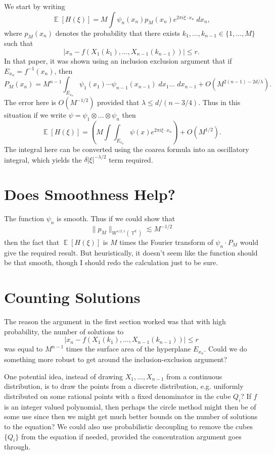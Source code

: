 \documentclass[dvipsnames,letterpaper,12pt]{article}
\numberwithin{equation}{section}
\DeclareMathOperator{\TT}{\mathbb{T}}
\numberwithin{theorem}{section}
\DeclareMathOperator{\EE}{\mathbb{E}}
\begin{document}
We start by writing
%
\[ \EE[H(\xi)] = M \int \psi_n(x_n) p_M(x_n) e^{2 \pi i \xi \cdot x_n}\; dx_n, \]
%
where $p_M(x_n)$ denotes the probability that there exists $k_1,\dots,k_{n-1} \in \{ 1, \dots, M \}$ such that
%
\[ |x_n - f(X_1(k_1),\dots, X_{n-1}(k_{n-1}))| \leq r. \]
%
In that paper, it was shown using an inclusion exclusion argument that if $E_{x_n} = f^{-1}(x_n)$, then
%
\[ P_M(x_n) = M^{n-1} \int_{E_{x_n}} \psi_1(x_1) \cdots \psi_{n-1}(x_{n-1})\; dx_1 \dots\; dx_{n-1} + O(M^{2(n-1) - 2d/\lambda}). \]
%
The error here is $O(M^{-1/2})$ provided that $\lambda \leq d / (n - 3/4)$. Thus in this situation if we write $\psi = \psi_1 \otimes \dots \otimes \psi_n$ then
%
\[ \EE[H(\xi)] = \left( M \int \int_{E_{x_n}} \psi(x) e^{2 \pi i \xi \cdot x_n} \right) + O(M^{1/2}). \]
%
The integral here can be converted using the coarea formula into an oscillatory integral, which yields the $\delta |\xi|^{-\lambda/2}$ term required.

\section{Does Smoothness Help?}

The function $\psi_n$ is smooth. Thus if we could show that
%
\[ \| p_M \|_{W^{s/2,1}(\TT^d)} \lesssim M^{-1/2} \]
%
then the fact that $\EE[H(\xi)]$ is $M$ times the  Fourier transform of $\psi_n \cdot P_M$ would give the required result. But heuristically, it doesn't seem like the function should be that smooth, though I should redo the calculation just to be sure.

\section{Counting Solutions}

The reason the argument in the first section worked was that with high probability, the number of solutions to
%
\[ |x_n - f(X_1(k_1), \dots, X_{n-1}(k_{n-1}))| \leq r \]
%
was equal to $M^{n-1}$ times the surface area of the hyperplane $E_{x_n}$. Could we do something more robust to get around the inclusion-exclusion argument?

One potential idea, instead of drawing $X_1,\dots,X_{n-1}$ from a continuous distribution, is to draw the points from a discrete distribution, e.g. uniformly distributed on some rational points with a fixed denominator in the cube $Q_i$? If $f$ is an integer valued polynomial, then perhaps the circle method might then be of some use since then we might get much better bounds on the number of solutions to the equation? We could also use probabilistic decoupling to remove the cubes $\{ Q_i \}$ from the equation if needed, provided the concentration argument goes through.
\end{document}
